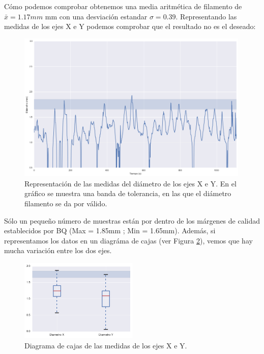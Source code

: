 Cómo podemos comprobar obtenemos una media aritmética de filamento de $ \bar{x} = 1.17mm $  mm con una desviación estandar $\sigma = 0.39$. Representando las medidas de los ejes X e Y podemos comprobar que el resultado no es el deseado:

\begin{figure}[H]
	\centering
	\includegraphics[width=0.99\textwidth]{images/producciones/16062015/output_9_1.png}
	\caption[Representación de las medidas del diámetro de los ejes X e Y.]{Representación de las medidas del diámetro de los ejes X e Y. En el gráfico se muestra una banda de tolerancia, en las que el diámetro filamento se da por válido.}
	\label{fig:prod_ejes}
\end{figure}

Sólo un pequeño número de muestras están por dentro de los márgenes de calidad establecidos por BQ (Max = 1.85mm ; Min = 1.65mm). Además, si representamos los datos en un diagráma de cajas (ver Figura \ref{fig:prod_boxplot}), vemos que hay mucha variación entre los dos ejes.
\begin{figure}[H]
    \centering
    \includegraphics[width=0.5\textwidth]{images/producciones/16062015/output_10_1.png}
    \caption{Diagrama de cajas de las medidas de los ejes X e Y.}
    \label{fig:prod_boxplot}
\end{figure}

